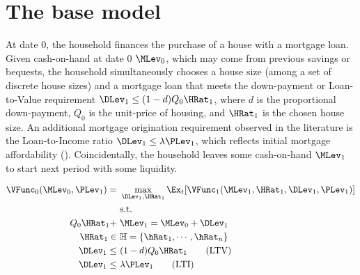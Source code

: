 \documentclass[PortfolioChoiceWithRiskyHousing]{subfiles}
\begin{document}
%

\section{The base model}

At date 0, the household finances the purchase of a house with a mortgage loan. Given cash-on-hand at date 0 $\MLev_{0}$, which may come from previous savings or bequests, the household simultaneously chooses a house size (among a set of discrete house sizes) and a mortgage loan that meets the down-payment or Loan-to-Value requirement $\DLev_{1} \le (1-d)Q_{0}\HRat_{1}$, where $d$ is the proportional down-payment, $Q_{0}$ is the unit-price of housing, and $\HRat_{1}$ is the chosen house size. An additional mortgage origination requirement observed in the literature is the Loan-to-Income ratio $\DLev_{1} \le \lambda \PLev_{1}$, which reflects initial mortgage affordability (\cite{ccMortgageDefault2013}). Coincidentally, the household leaves some cash-on-hand $\MLev_{1}$ to start next period with some liquidity.

\begin{equation}
	\begin{split}
		\VFunc_{0}(\MLev_{0}, \PLev_{1}) = &~ \max_{\DLev_{1}, \HRat_{1}} \Ex_{t} [\VFunc_{1}(\MLev_{1}, \HRat_{1}, \DLev_{1}, \PLev_{1}) ]\\
		&~ \text{s.t.} \\
		Q_{0} \HRat_{1} + &~ \MLev_{1} = \MLev_{0} + \DLev_{1} \\
		\HRat_{1} \in &~ \mathbb{H} = \{\hRat_{1}, \cdots, \hRat_{n}\} \\
		\DLev_{1} \le &~ (1-d)Q_{0} \HRat_{1} \qquad \text{(LTV)} \\
		\DLev_{1} \le &~ \lambda \PLev_{1} \qquad \text{(LTI)} \\
	\end{split}
\end{equation}
\end{document}
